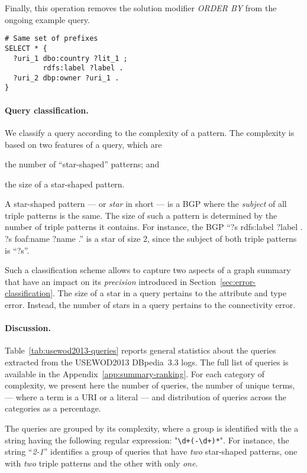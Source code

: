 Finally, this operation removes the solution modifier \emph{ORDER BY} from the ongoing example query.
\begin{verbatim}
# Same set of prefixes
SELECT * {
  ?uri_1 dbo:country ?lit_1 ;
         rdfs:label ?label .
  ?uri_2 dbp:owner ?uri_1 .
}
\end{verbatim}

\paragraph{Query classification.}

We classify a query according to the complexity of a pattern. The complexity is based on two features of a query, which are
\begin{inparaenum}[(i)]
	\item the number of ``star-shaped'' patterns; and
	\item the size of a star-shaped pattern.
\end{inparaenum}

A star-shaped pattern --- or \emph{star} in short --- is a BGP where the \emph{subject} of all triple patterns is the same. The size of such a pattern is determined by the number of triple patterns it contains. For instance, the BGP ``?s rdfs:label ?label . ?s foaf:name ?name .'' is a star of size 2, since the subject of both triple patterns is ``?s''.

Such a classification scheme allows to capture two aspects of a graph summary that have an impact on its \emph{precision} introduced in Section~\ref{sec:error-classification}. The size of a star in a query pertains to the attribute and type error. Instead, the number of stars in a query pertains to the connectivity error.

\paragraph{Discussion.}

Table~\ref{tab:usewod2013-queries} reports general statistics about the queries extracted from the USEWOD2013 DBpedia~3.3 logs. The full list of queries is available in the Appendix~\ref{app:summary-ranking}. For each category of complexity, we present here the number of queries, the number of unique terms, --- where a term is a URI or a literal --- and distribution of queries across the categories as a percentage.

The queries are grouped by its complexity, where a group is identified with the a string having the following regular expression: "\verb/\d+(-\d+)*/". For instance, the string ``\emph{2-1}'' identifies a group of queries that have \textit{two} star-shaped patterns, one with \textit{two} triple patterns and the other with only \textit{one}.

